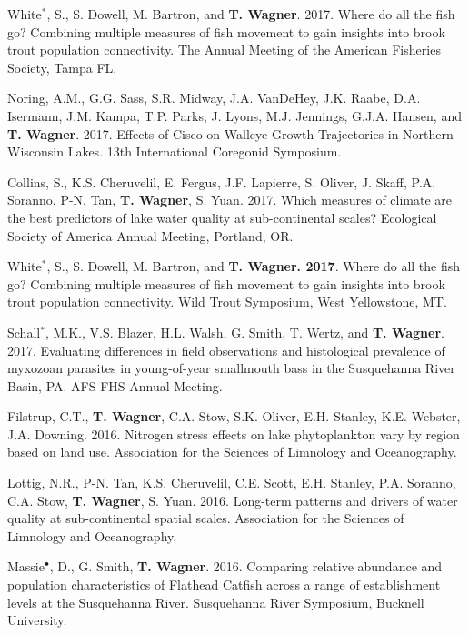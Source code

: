 \documentclass[10pt]{article}
\begin{document}
\begin{flushleft}
\begin{etaremune}
\item White$^*$, S., S. Dowell, M. Bartron, and {\bf T. Wagner}. 2017. Where do all the fish go? Combining multiple measures of fish movement to gain insights into brook trout population connectivity. The Annual Meeting of the American Fisheries Society, Tampa FL.

\item Noring, A.M., G.G. Sass, S.R. Midway, J.A. VanDeHey, J.K. Raabe, D.A. Isermann, J.M. Kampa, T.P. Parks, J. Lyons, M.J. Jennings, G.J.A. Hansen, and {\bf T. Wagner}. 2017. Effects of Cisco on Walleye Growth Trajectories in Northern Wisconsin Lakes. 13th International Coregonid Symposium.

\item Collins, S., K.S. Cheruvelil, E. Fergus, J.F. Lapierre, S. Oliver, J. Skaff, P.A. Soranno, P-N. Tan, {\bf T. Wagner}, S. Yuan. 2017. Which measures of climate are the best predictors of lake water quality at sub-continental scales? Ecological Society of America Annual Meeting, Portland, OR. 

\item White$^*$, S., S. Dowell, M. Bartron, and {\bf T. Wagner. 2017}. Where do all the fish go? Combining multiple measures of fish movement to gain insights into brook trout population connectivity. Wild Trout Symposium, West Yellowstone, MT.

\item Schall$^*$, M.K., V.S. Blazer, H.L. Walsh, G. Smith, T. Wertz, and {\bf T. Wagner}. 2017. Evaluating differences in field observations and histological prevalence of myxozoan parasites in young-of-year smallmouth bass in the Susquehanna River Basin, PA. AFS FHS Annual Meeting.

\item Filstrup, C.T.,  {\bf T. Wagner}, C.A. Stow, S.K. Oliver, E.H. Stanley, K.E. Webster, J.A. Downing. 2016. Nitrogen stress effects on lake phytoplankton vary by region based on land use. Association for the Sciences of Limnology and Oceanography. 

\item Lottig, N.R., P-N. Tan, K.S. Cheruvelil, C.E. Scott, E.H. Stanley, P.A. Soranno, C.A. Stow, {\bf T. Wagner}, S. Yuan. 2016. Long-term patterns and drivers of water quality at sub-continental spatial scales. Association for the Sciences of Limnology and Oceanography. 

\item Massie$^\bullet$, D., G. Smith, {\bf T. Wagner}. 2016. Comparing relative abundance and population characteristics of Flathead Catfish across a range of establishment levels at the Susquehanna River. Susquehanna River Symposium, Bucknell University. 


\end{etaremune}
\end{flushleft}
\end{document}
